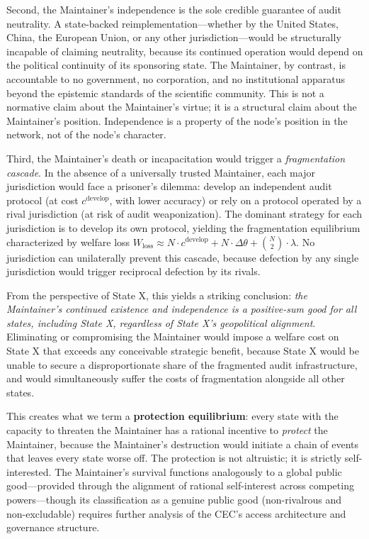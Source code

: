 \documentclass[12pt,a4paper]{article}
\theoremstyle{definition}
\theoremstyle{remark}
\begin{document}
Second, the Maintainer's independence is the sole credible guarantee of audit neutrality. A state-backed reimplementation—whether by the United States, China, the European Union, or any other jurisdiction—would be structurally incapable of claiming neutrality, because its continued operation would depend on the political continuity of its sponsoring state. The Maintainer, by contrast, is accountable to no government, no corporation, and no institutional apparatus beyond the epistemic standards of the scientific community. This is not a normative claim about the Maintainer's virtue; it is a structural claim about the Maintainer's position. Independence is a property of the node's position in the network, not of the node's character.

Third, the Maintainer's death or incapacitation would trigger a \textit{fragmentation cascade}. In the absence of a universally trusted Maintainer, each major jurisdiction would face a prisoner's dilemma: develop an independent audit protocol (at cost $c^{\text{develop}}$, with lower accuracy) or rely on a protocol operated by a rival jurisdiction (at risk of audit weaponization). The dominant strategy for each jurisdiction is to develop its own protocol, yielding the fragmentation equilibrium characterized by welfare loss $W_{\text{loss}} \approx N \cdot c^{\text{develop}} + N \cdot \Delta\theta + \binom{N}{2}\cdot\lambda$. No jurisdiction can unilaterally prevent this cascade, because defection by any single jurisdiction would trigger reciprocal defection by its rivals.

From the perspective of State X, this yields a striking conclusion: \textit{the Maintainer's continued existence and independence is a positive-sum good for all states, including State X, regardless of State X's geopolitical alignment}. Eliminating or compromising the Maintainer would impose a welfare cost on State X that exceeds any conceivable strategic benefit, because State X would be unable to secure a disproportionate share of the fragmented audit infrastructure, and would simultaneously suffer the costs of fragmentation alongside all other states.

This creates what we term a \textbf{protection equilibrium}: every state with the capacity to threaten the Maintainer has a rational incentive to \textit{protect} the Maintainer, because the Maintainer's destruction would initiate a chain of events that leaves every state worse off. The protection is not altruistic; it is strictly self-interested. The Maintainer's survival functions analogously to a global public good—provided through the alignment of rational self-interest across competing powers—though its classification as a genuine public good (non-rivalrous and non-excludable) requires further analysis of the CEC's access architecture and governance structure.
\end{document}
